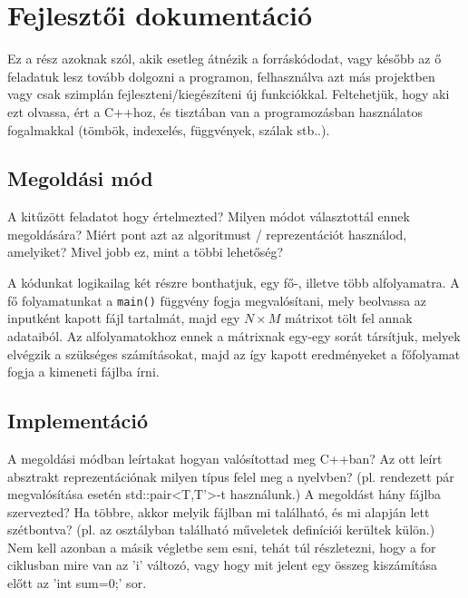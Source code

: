 \documentclass[12pt]{article}
\begin{document}
\section{Fejlesztői dokumentáció}

\begin{itshape}
	Ez a rész azoknak szól, akik esetleg átnézik a forráskódodat, vagy később az ő feladatuk lesz tovább dolgozni a programon, felhasználva azt más projektben vagy csak szimplán fejleszteni/kiegészíteni új funkciókkal. Feltehetjük, hogy aki ezt olvassa, ért a C++hoz, és tisztában van a programozásban használatos fogalmakkal (tömbök, indexelés, függvények, szálak stb..).
\end{itshape}

\subsection{Megoldási mód}


\begin{itshape}
A kitűzött feladatot hogy értelmezted? Milyen módot választottál ennek megoldására? Miért pont azt az algoritmust / reprezentációt használod, amelyiket? Mivel jobb ez, mint a többi lehetőség?	\\
\end{itshape}

A kódunkat logikailag két részre bonthatjuk, egy fő-, illetve több alfolyamatra. A fő folyamatunkat a \verb|main()| függvény fogja megvalósítani, mely beolvassa az inputként kapott fájl tartalmát, majd egy $N \times M$ mátrixot tölt fel annak adataiból. Az alfolyamatokhoz ennek a mátrixnak egy-egy sorát társítjuk, melyek elvégzik a szükséges számításokat, majd az így kapott eredményeket a főfolyamat fogja a kimeneti fájlba írni.
\subsection{Implementáció}

\begin{itshape}
A megoldási módban leírtakat hogyan valósítottad meg C++ban? Az ott leírt absztrakt reprezentációnak milyen típus felel meg a nyelvben? (pl. rendezett pár megvalósítása esetén std::pair<T,T'>-t használunk.) A megoldást hány fájlba szervezted? Ha többre, akkor melyik fájlban mi található, és mi alapján lett szétbontva? (pl. az osztályban található műveletek definíciói kerültek külön.) Nem kell azonban a másik végletbe sem esni, tehát túl részletezni, hogy a for ciklusban mire van az 'i' változó, vagy hogy mit jelent egy összeg kiszámítása előtt az 'int sum=0;' sor. \\
\end{itshape}
\end{document}
